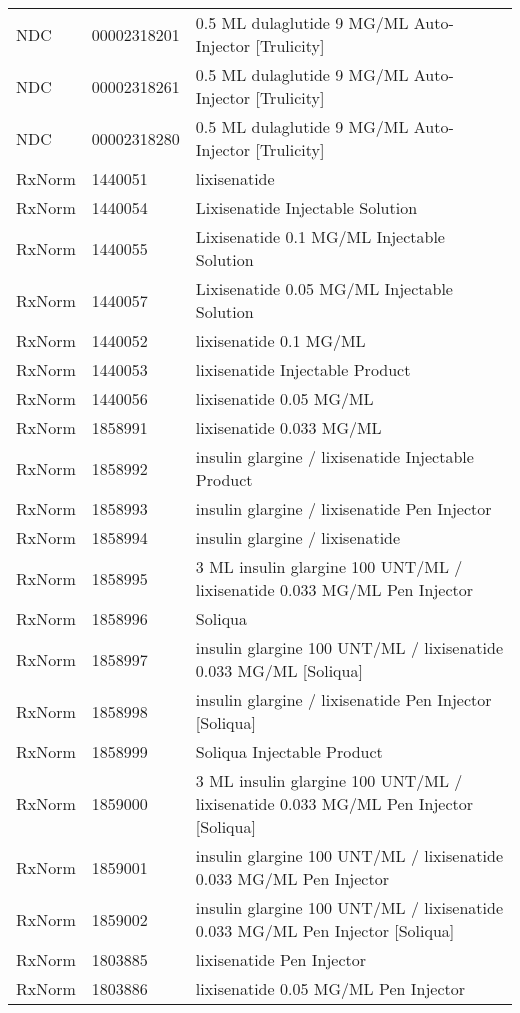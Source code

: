 \begin{longtable}{p{}p{}p{}}
  NDC & 00002318201 & 0.5 ML dulaglutide 9 MG/ML Auto-Injector [Trulicity] \\ 
  NDC & 00002318261 & 0.5 ML dulaglutide 9 MG/ML Auto-Injector [Trulicity] \\ 
  NDC & 00002318280 & 0.5 ML dulaglutide 9 MG/ML Auto-Injector [Trulicity] \\ 
  RxNorm & 1440051 & lixisenatide \\ 
  RxNorm & 1440054 & Lixisenatide Injectable Solution \\ 
  RxNorm & 1440055 & Lixisenatide 0.1 MG/ML Injectable Solution \\ 
  RxNorm & 1440057 & Lixisenatide 0.05 MG/ML Injectable Solution \\ 
  RxNorm & 1440052 & lixisenatide 0.1 MG/ML \\ 
  RxNorm & 1440053 & lixisenatide Injectable Product \\ 
  RxNorm & 1440056 & lixisenatide 0.05 MG/ML \\ 
  RxNorm & 1858991 & lixisenatide 0.033 MG/ML \\ 
  RxNorm & 1858992 & insulin glargine / lixisenatide Injectable Product \\ 
  RxNorm & 1858993 & insulin glargine / lixisenatide Pen Injector \\ 
  RxNorm & 1858994 & insulin glargine / lixisenatide \\ 
  RxNorm & 1858995 & 3 ML insulin glargine 100 UNT/ML / lixisenatide 0.033 MG/ML Pen Injector \\ 
  RxNorm & 1858996 & Soliqua \\ 
  RxNorm & 1858997 & insulin glargine 100 UNT/ML / lixisenatide 0.033 MG/ML [Soliqua] \\ 
  RxNorm & 1858998 & insulin glargine / lixisenatide Pen Injector [Soliqua] \\ 
  RxNorm & 1858999 & Soliqua Injectable Product \\ 
  RxNorm & 1859000 & 3 ML insulin glargine 100 UNT/ML / lixisenatide 0.033 MG/ML Pen Injector [Soliqua] \\ 
  RxNorm & 1859001 & insulin glargine 100 UNT/ML / lixisenatide 0.033 MG/ML Pen Injector \\ 
  RxNorm & 1859002 & insulin glargine 100 UNT/ML / lixisenatide 0.033 MG/ML Pen Injector [Soliqua] \\ 
  RxNorm & 1803885 & lixisenatide Pen Injector \\ 
  RxNorm & 1803886 & lixisenatide 0.05 MG/ML Pen Injector \\ 

\end{longtable}

